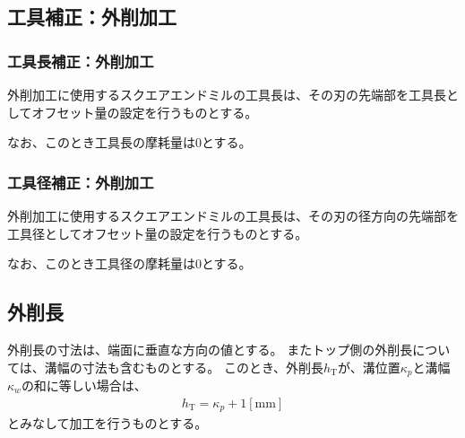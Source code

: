 \subsection{工具補正：外削加工}


\subsubsection{工具長補正：外削加工}
外削加工に使用するスクエアエンドミルの工具長は、その刃の先端部を工具長としてオフセット量の設定を行うものとする。

なお、このとき工具長の摩耗量は0とする。


\subsubsection{工具径補正：外削加工}
外削加工に使用するスクエアエンドミルの工具長は、その刃の径方向の先端部を工具径としてオフセット量の設定を行うものとする。

なお、このとき工具径の摩耗量は0とする。


\subsection{外削長}
外削長の寸法は、端面に垂直な方向の値とする。
またトップ側の外削長については、溝幅の寸法も含むものとする。
このとき、外削長$h_\mathrm T$が、溝位置$\kappa_p$と溝幅$\kappa_w$の和に等しい場合は、
\begin{align*}
  h_\mathrm T = \kappa_p+1[\text{mm}]
\end{align*}
とみなして加工を行うものとする。


